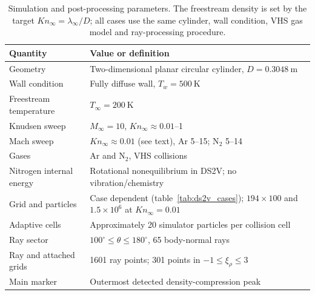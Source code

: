 \begin{table}
\centering
\caption{Simulation and post-processing parameters. The freestream density is
set by the target \(Kn_\infty=\lambda_\infty/D\); all cases use the same
cylinder, wall condition, VHS gas model and ray-processing procedure.}
\label{tab:case_summary}
\begin{tabular}{ll}
\toprule
Quantity & Value or definition \\
\midrule
Geometry & Two-dimensional planar circular cylinder, \(D=0.3048~\mathrm{m}\) \\
Wall condition & Fully diffuse wall, \(T_w=500~\mathrm{K}\) \\
Freestream temperature & \(T_\infty=200~\mathrm{K}\) \\
Knudsen sweep & \(M_\infty=10\), \(Kn_\infty\approx0.01\)--1 \\
Mach sweep & \(Kn_\infty\approx0.01\) (see text), Ar 5--15; N$_2$ 5--14 \\
Gases & Ar and N\(_2\), VHS collisions \\
Nitrogen internal energy & Rotational nonequilibrium in DS2V; no vibration/chemistry \\
Grid and particles & Case dependent (table~\ref{tab:ds2v_cases}); \(194\times100\) and \(1.5\times10^6\) at \(Kn_\infty=0.01\) \\
Adaptive cells & Approximately 20 simulator particles per collision cell \\
Ray sector & \(100^\circ\leq\theta\leq180^\circ\), 65 body-normal rays \\
Ray and attached grids & 1601 ray points; 301 points in \(-1\leq\xi_\rho\leq3\) \\
Main marker & Outermost detected density-compression peak \\
\bottomrule
\end{tabular}
\end{table}
